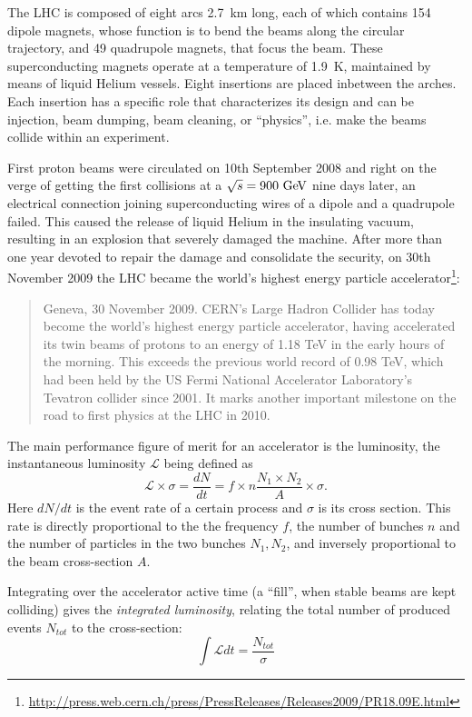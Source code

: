 The LHC is composed of eight arcs 2.7~km long, each of which contains 154 dipole 
magnets, whose function is to  bend the beams along the circular trajectory, and
49 quadrupole magnets, that focus the beam. These superconducting magnets operate
at a temperature of 1.9~K, maintained by means of liquid Helium vessels.
Eight insertions are placed inbetween the arches. Each insertion has a specific
role that characterizes its design and can be injection, beam dumping, beam cleaning,
or ``physics'', i.e. make the beams collide within an experiment.

First proton beams were circulated on 10th September 2008 and right on the verge of
getting the first collisions at a \cme $\rts=900\gev$ nine days later, an electrical
connection joining superconducting wires of a dipole and a quadrupole
failed. This caused the release of liquid Helium in the insulating vacuum,
resulting in an explosion that severely damaged the machine.
After more than one year devoted to repair the damage and consolidate the security,
on 30th November 2009 the LHC became the world's highest energy particle 
accelerator\footnote{\url{http://press.web.cern.ch/press/PressReleases/Releases2009/PR18.09E.html}}:
\begin{quotation}\small
Geneva, 30 November 2009. CERN's Large Hadron Collider has today become the world’s highest energy particle accelerator, having accelerated its twin beams of protons to an energy of 1.18 TeV in the early hours of the morning. This exceeds the previous world record of 0.98 TeV, which had been held by the US Fermi National Accelerator Laboratory’s Tevatron collider since 2001. It marks another important milestone on the road to first physics at the LHC in 2010.
\end{quotation}





The main performance figure of merit for an accelerator is the luminosity, the 
instantaneous luminosity $\mathcal L$ being defined as 
\begin{equation}\label{eq:lumiN}
\mathcal{L}\times\sigma=\dfrac{dN}{dt}=f\times n\dfrac{N_1\times N_2}{A}\times\sigma.
\end{equation} 
Here $dN/dt $ is the event rate of a certain process and $\sigma$ is its cross 
section. This rate is directly proportional to the the frequency $f$, the number 
of bunches $n$ and the number of particles in the two bunches $N_1, N_2$, and
inversely proportional to the beam cross-section $A$.

Integrating over the accelerator active time (a ``fill'', when stable beams are kept
colliding) gives the \textit{integrated luminosity}, relating the total number 
of produced events $N_{tot}$ to the cross-section:
\begin{equation}\label{eq:intLumi}
\int \mathcal L dt  = \dfrac{N_{tot}}{\sigma} 
\end{equation}
